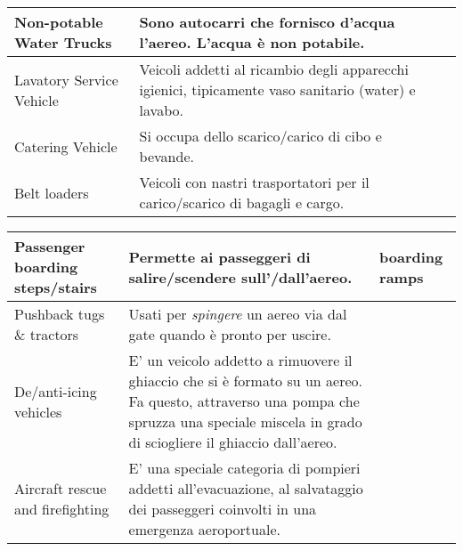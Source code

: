 \begin{table}[htp]
{\begin{tabular}{p{}p{}p{}}
			\hline
			\textsf{\small Non-potable Water Trucks} & \textsf{\small Sono autocarri che fornisco d'acqua l'aereo. L'acqua è non potabile.} & \textsf{\small } \\
			\hline
			\textsf{\small Lavatory Service Vehicle} & \textsf{\small Veicoli addetti al ricambio degli apparecchi igienici, tipicamente vaso sanitario (water) e lavabo.} & \textsf{\small } \\
			\hline
			\textsf{\small Catering Vehicle} & \textsf{\small Si occupa dello scarico/carico di cibo e bevande.} & \textsf{\small } \\
			\hline
			\textsf{\small Belt loaders} & \textsf{\small Veicoli con nastri trasportatori per il carico/scarico di bagagli e cargo.} & \textsf{\small } \\
			\hline
		\end{tabular}%
	}%
\end{table}
\pagebreak
\begin{table}[htp]
	\centering
	{\small %
		\begin{tabular}{p{}p{}p{}}
			\textsf{\small Passenger boarding steps/stairs} & \textsf{\small Permette ai passeggeri di salire/scendere sull'/dall'aereo.} & \textsf{\small boarding ramps} \\
			\hline
			\textsf{\small Pushback tugs \& tractors} & \textsf{\small Usati per \emph{spingere} un aereo via dal gate quando è pronto per uscire.} & \textsf{\small } \\
			\hline
			\textsf{\small De/anti-icing vehicles} & \textsf{\small E' un veicolo addetto a rimuovere il ghiaccio che si è formato su un aereo. Fa questo, attraverso una pompa che spruzza una speciale miscela in grado di sciogliere il ghiaccio dall'aereo.} & \textsf{\small } \\
			\hline
			\textsf{\small Aircraft rescue and firefighting} & \textsf{\small E' una speciale categoria di pompieri addetti all'evacuazione, al salvataggio dei passeggeri coinvolti in una emergenza aeroportuale.} & \textsf{\small } \\
			\hline
		\end{tabular}%
}%
\end{table}

